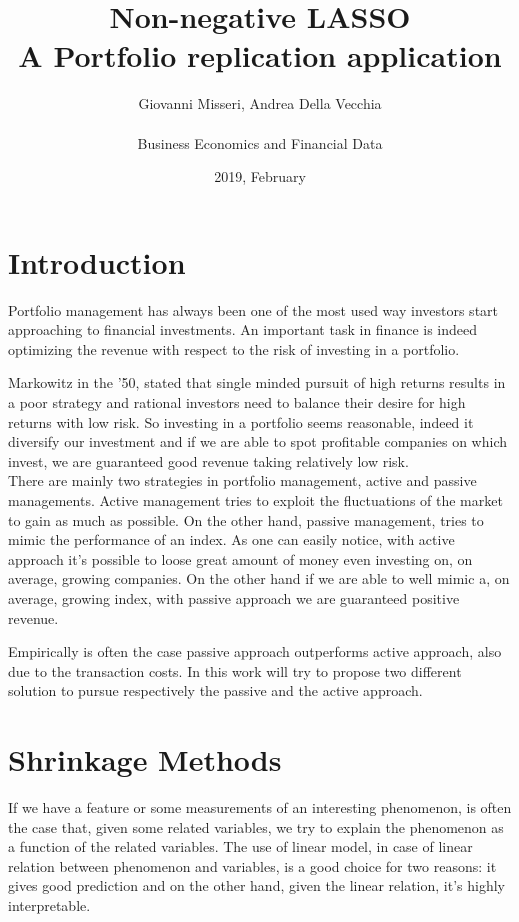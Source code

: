 \documentclass{article}%
\title{%
  Non-negative LASSO \\
  \large A Portfolio replication application}
\date{2019, February}
\author{Giovanni Misseri, Andrea Della Vecchia \\ \\ 
Business Economics and Financial Data}
\begin{document}
\maketitle
\tableofcontents
\newpage
\section{Introduction}

Portfolio management has always been one of the most used way investors start approaching to financial investments. An important task in finance is indeed optimizing the revenue with respect to the risk of investing in a portfolio.

Markowitz in the '50, stated that single minded pursuit of high returns results in a poor strategy and rational investors need to balance their desire for high returns with low risk. So investing in a portfolio seems reasonable, indeed it diversify our investment and if we are able to spot profitable companies on which invest, we are guaranteed good revenue taking relatively low risk.
\\

There are mainly two strategies in portfolio management, active and passive managements. Active management tries to exploit the fluctuations of the market to gain as much as possible. On the other hand, passive management, tries to mimic the performance of an index. As one can easily notice, with active approach it's possible to loose great amount of money even investing on, on average, growing companies. On the other hand if we are able to well mimic a, on average, growing index, with passive approach we are guaranteed positive revenue.

Empirically is often the case passive approach outperforms active approach, also due to the transaction costs. In this work will try to propose two different solution to pursue respectively the passive and the active approach.

\newpage
\section{Shrinkage Methods}

If we have a feature or some measurements of an interesting phenomenon, is often the case that, given some related variables, we try to explain the phenomenon as a function of the related variables. The use of linear model, in case of linear relation between phenomenon and variables, is a good choice for two reasons: it gives good prediction and on the other hand, given the linear relation, it's highly interpretable. 
\end{document}
